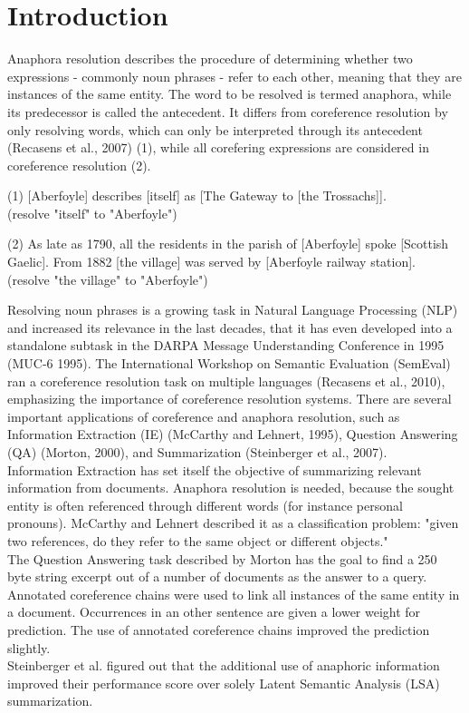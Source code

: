 \chapter{Introduction}
\label{sec:Introduction}

Anaphora resolution describes the procedure of determining whether two expressions - commonly noun phrases -  refer to each other, meaning that they are instances of the same entity. The word to be resolved is termed anaphora, while its predecessor is called the antecedent. It differs from coreference resolution by only resolving words, which can only be interpreted through its antecedent (Recasens et al., 2007) (1), while all corefering expressions are considered in coreference resolution (2).

(1) [Aberfoyle] describes [itself] as [The Gateway to [the Trossachs]]. \\
(resolve "itself" to "Aberfoyle")

(2) As late as 1790, all the residents in the parish of [Aberfoyle] spoke [Scottish Gaelic]. From 1882 [the village] was served by [Aberfoyle railway station].\\
(resolve "the village"  to "Aberfoyle")

Resolving noun phrases is a growing task in Natural Language Processing (NLP) and increased its relevance in the last decades, that it has even developed into a standalone subtask in the DARPA Message Understanding Conference in 1995 (MUC-6 1995). The International Workshop on Semantic Evaluation (SemEval) ran a coreference resolution task on multiple languages (Recasens et al., 2010), emphasizing the importance of coreference resolution systems. 
There are several important applications of coreference and anaphora resolution, such as Information Extraction (IE) (McCarthy and Lehnert, 1995), Question Answering (QA) (Morton, 2000), and Summarization (Steinberger et al., 2007).\\ 
Information Extraction has set itself the objective of summarizing relevant information from documents. Anaphora resolution is needed, because the sought entity is often referenced through different words (for instance personal pronouns). McCarthy and Lehnert described it as a classification problem: "given two references, do they refer to the same object or different objects."\\
The Question Answering task described by Morton has the goal to find a 250 byte string excerpt out of a number of documents as the answer to a query. Annotated coreference chains were used to link all instances of the same entity in a document. Occurrences in an other sentence are given a lower weight for prediction. The use of annotated coreference chains improved the prediction slightly.\\
Steinberger et al. figured out that the additional use of anaphoric information improved their performance score over solely Latent Semantic Analysis (LSA) summarization.

